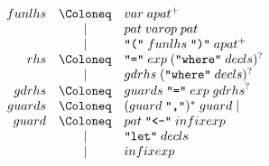 \begin{align*}
  \begin{array}{rcl}
    {funlhs}
    & \Coloneq & {var}\; {apat}^+ \\
    & \mid & {pat}\; {varop}\; {pat} \\
    & \mid & \text{\texttt{\textquotedbl(\textquotedbl}}\; {funlhs}\; \text{\texttt{\textquotedbl)\textquotedbl}}\; {apat}^+ \\
    {rhs}
    & \Coloneq & \text{\texttt{\textquotedbl =\textquotedbl}}\; {exp}\; (\text{\texttt{\textquotedbl where\textquotedbl}}\; {decls})^? \\
    & \mid & {gdrhs}\; (\text{\texttt{\textquotedbl where\textquotedbl}}\; {decls})^? \\
    {gdrhs}
    & \Coloneq & {guards}\; \text{\texttt{\textquotedbl =\textquotedbl}}\; {exp}\; {gdrhs}^? \\
    {guards}
    & \Coloneq & ({guard}\; \text{\texttt{\textquotedbl ,\textquotedbl}})^*\; {guard} \mid \\
    {guard}
    & \Coloneq & {pat}\; \text{\texttt{\textquotedbl <-\textquotedbl}}\; {infixexp} \\
    & \mid & \text{\texttt{\textquotedbl let\textquotedbl}}\; {decls} \\
    & \mid & {infixexp}
  \end{array}
\end{align*}


